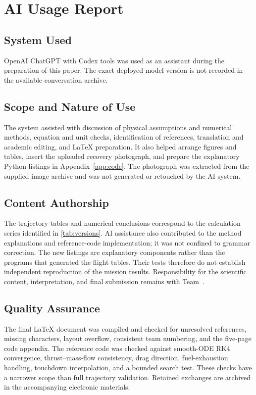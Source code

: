 \section{AI Usage Report}
\label{sec:ai}
\subsection{System Used}
OpenAI ChatGPT with Codex tools was used as an assistant during the preparation of this paper. The exact deployed model version is not recorded in the available conversation archive.

\subsection{Scope and Nature of Use}
The system assisted with discussion of physical assumptions and numerical methods, equation and unit checks, identification of references, translation and academic editing, and LaTeX preparation. It also helped arrange figures and tables, insert the uploaded recovery photograph, and prepare the explanatory Python listings in Appendix~\ref{app:code}. The photograph was extracted from the supplied image archive and was not generated or retouched by the AI system.

\subsection{Content Authorship}
The trajectory tables and numerical conclusions correspond to the calculation series identified in \cref{tab:versions}. AI assistance also contributed to the method explanations and reference-code implementation; it was not confined to grammar correction. The new listings are explanatory components rather than the programs that generated the flight tables. Their tests therefore do not establish independent reproduction of the mission results. Responsibility for the scientific content, interpretation, and final submission remains with Team~\TeamNumber.

\subsection{Quality Assurance}
The final LaTeX document was compiled and checked for unresolved references, missing characters, layout overflow, consistent team numbering, and the five-page code appendix. The reference code was checked against smooth-ODE RK4 convergence, thrust--mass-flow consistency, drag direction, fuel-exhaustion handling, touchdown interpolation, and a bounded search test. These checks have a narrower scope than full trajectory validation. Retained exchanges are archived in the accompanying electronic materials.
